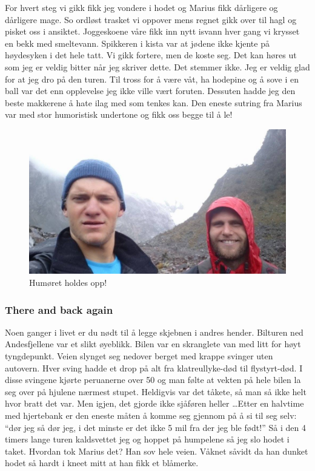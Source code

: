 For
hvert steg vi gikk fikk jeg vondere i hodet og Marius fikk dårligere og
dårligere mage. So ordløst trasket vi oppover mens regnet gikk over
til hagl og pisket oss i ansiktet. Joggeskoene våre fikk inn nytt
isvann hver gang vi krysset en bekk med smeltevann. Spikkeren i kista
var at jødene ikke kjente på høydesyken i det hele tatt. Vi gikk
fortere, men de koste seg. Det kan høres ut som jeg er veldig bitter
når jeg skriver dette. Det stemmer ikke. Jeg er veldig glad for at jeg
dro på den turen. Til tross for å være våt, ha hodepine og å sove i
en ball var det enn opplevelse jeg ikke ville vært foruten. Dessuten
hadde jeg den beste makkerene å hate ilag med som tenkes kan. Den
eneste sutring fra Marius var med stor
humoristisk undertone og fikk oss begge til å le!
\begin{figure}[!h]
	\centering
	\includegraphics[width=\textwidth]{akselogmariusiregn2}
	\caption*{Humøret holdes opp!}
\label{fig:turiregnet}
\end{figure}
\subsubsection{There and back again}
Noen ganger i livet er du nødt til å legge skjebnen i andres hender.
Bilturen ned Andesfjellene var et slikt øyeblikk. Bilen var en
skranglete van med litt for høyt tyngdepunkt. Veien slynget seg
nedover berget med krappe svinger uten autovern. Hver sving hadde et
drop på alt fra klatreullyke-død til flystyrt-død. I disse svingene
kjørte peruanerne over 50 og man følte at vekten på hele
bilen la seg over på hjulene nærmest stupet. Heldigvis var det tåkete,
så man så ikke helt hvor bratt det var. Men igjen, det gjorde ikke
sjåføren heller \ldots Etter en halvtime med hjertebank er den eneste
måten å komme seg gjennom på å si til seg selv: ``dør jeg så dør jeg,
i det minste er det ikke 5 mil fra der jeg ble født!'' Så i den 4
timers lange turen kaldsvettet jeg og hoppet på humpelene så jeg slo
hodet i taket. Hvordan tok Marius det? Han sov hele veien. Våknet
såvidt da han dunket hodet så hardt i kneet mitt at han fikk et
blåmerke. 

